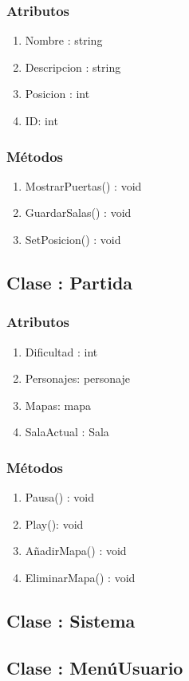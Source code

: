 \subsubsection{Atributos}
\begin{enumerate}
\item Nombre : string
\item Descripcion : string
\item Posicion : int
\item ID: int
\end{enumerate}

\subsubsection{Métodos}
\begin{enumerate}
\item MostrarPuertas() : void
\item GuardarSalas() : void
\item SetPosicion() : void
\end{enumerate}




\subsection{Clase : Partida}\label{sec:uc0}
\subsubsection{Atributos}
\begin{enumerate}
\item Dificultad : int
\item Personajes: personaje
\item Mapas: mapa
\item SalaActual : Sala
\end{enumerate}

\subsubsection{Métodos}
\begin{enumerate}
\item Pausa() : void
\item Play(): void
\item AñadirMapa() : void
\item EliminarMapa() : void
\end{enumerate}




\subsection{Clase : Sistema}\label{sec:uc0}





\subsection{Clase : MenúUsuario}\label{sec:uc0}